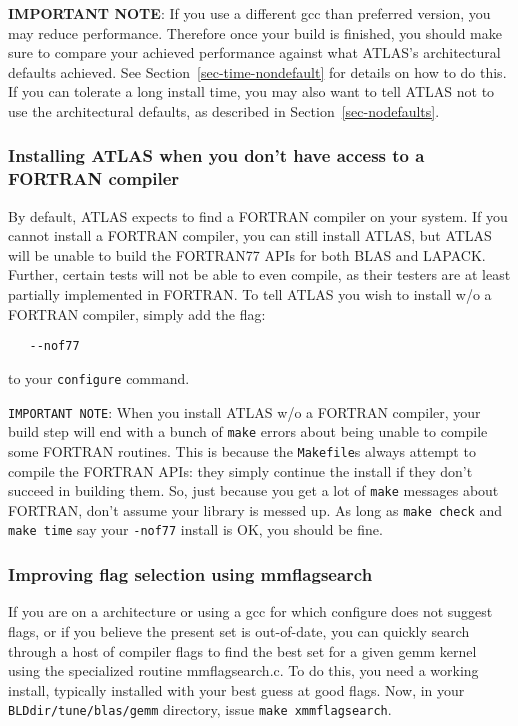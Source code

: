 \documentclass[11pt]{article}
\begin{document}
{\bf IMPORTANT NOTE}: If you use a different gcc than preferred version,
you may reduce performance.  Therefore once
your build is finished, you should make sure to compare your achieved
performance against what ATLAS's architectural defaults achieved.  See
Section~\ref{sec-time-nondefault} for details on how to do this.
If you can tolerate a long install time, you may also
want to tell ATLAS not to use the architectural defaults, as described
in Section~\ref{sec-nodefaults}.


\subsubsection{Installing ATLAS when you don't have access to a FORTRAN
compiler}
\label{sec-nof77}

By default, ATLAS expects to find a FORTRAN compiler on your system.  If
you cannot install a FORTRAN compiler, you can still install ATLAS, but
ATLAS will be unable to build the FORTRAN77 APIs for both BLAS and LAPACK.
Further, certain tests will not be able to even compile, as their testers
are at least partially implemented in FORTRAN.  To tell ATLAS you wish
to install w/o a FORTRAN compiler, simply add the flag:
\vspace*{-0.1in}
\begin{verbatim}
   --nof77
\end{verbatim}
to your {\tt configure} command.

{\tt IMPORTANT NOTE}: When you install ATLAS w/o a FORTRAN compiler,
your build step will end with a bunch of {\tt make} errors about being
unable to compile some FORTRAN routines.  This is because the {\tt Makefile}s
always attempt to compile the FORTRAN APIs: they simply continue the install
if they don't succeed in building them.  So, just because you get a lot
of {\tt make} messages about FORTRAN, don't assume your library is messed
up.  As long as {\tt make check} and {\tt make time} say your {\tt -nof77}
install is OK, you should be fine.

\newpage
\subsubsection{Improving flag selection using mmflagsearch}
\label{sec-flagsearch}

If you are on a architecture or using a gcc for which configure does
not suggest flags, or if you believe the present set is out-of-date,
you can quickly search through a host of compiler flags to find the
best set for a given gemm kernel using the specialized routine
mmflagsearch.c.  To do this, you need a working install, typically
installed with your best guess at good flags.  Now, in your
{\tt BLDdir/tune/blas/gemm} directory, issue {\tt make xmmflagsearch}.
\end{document}
